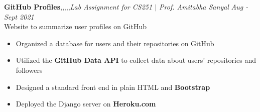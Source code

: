 \textbf{GitHub Profiles}\sep\py\sep\django\sep\gh\sep\bs\sep{\it Lab Assignment for CS251 $|$ Prof. Amitabha Sanyal}  \hfill{\sl \small Aug - Sept 2021}\\
\vspace{-8pt}
\emerrow Website to summarize user profiles on GitHub
\begin{itemize}[itemsep = -1.3 mm, leftmargin=*]
\item Organized a database for users and their repositories on GitHub
\item Utilized the {\bf GitHub Data API} to collect data about users' repositories and followers
\item Designed a standard front end in plain HTML and {\bf Bootstrap}
\item Deployed the Django server on {\bf Heroku.com}
\end{itemize}